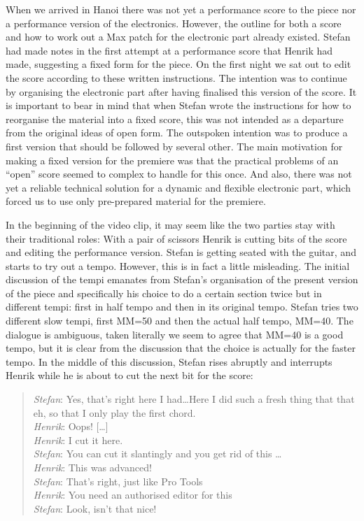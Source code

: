  When we arrived in Hanoi there was not yet a performance score to the
 piece nor a performance version of the electronics. However, the
 outline for both a score and how to work out a Max patch for the
 electronic part already existed. Stefan had made notes in the first
 attempt at a performance score that Henrik had made, suggesting a
 fixed form for the piece. On the first night we sat out to edit the
 score according to these written instructions. The intention was to
 continue by organising the electronic part after having finalised
 this version of the score. It is important to bear in mind that when
 Stefan wrote the instructions for how to reorganise the material into
 a fixed score, this was not intended as a departure from the original
 ideas of open form. The outspoken intention was to produce a first
 version that should be followed by several other. The main motivation
 for making a fixed version for the premiere was that the practical
 problems of an ``open'' score seemed to complex to handle for this
 once. And also, there was not yet a reliable technical solution for a
 dynamic and flexible electronic part, which forced us to use only
 pre-prepared material for the premiere.
 
In the beginning of the video clip, it may seem like the two parties
stay with their traditional roles: With a pair of scissors Henrik is
cutting bits of the score and editing the performance version. Stefan
is getting seated with the guitar, and starts to try out a
tempo. However, this is in fact a little misleading. The initial
discussion of the tempi emanates from Stefan's organisation of the
present version of the piece and specifically his choice to do a
certain section twice but in different tempi: first in half tempo and
then in its original tempo. Stefan tries two different slow tempi,
first MM=50 and then the actual half tempo, MM=40. The dialogue is
ambiguous, taken literally we seem to agree that MM=40 is a good
tempo, but it is clear from the discussion that the choice is actually
for the faster tempo. In the middle of this discussion, Stefan rises
abruptly and interrupts Henrik while he is about to cut the next bit
for the score:

\begin{quote}
  \emph{Stefan}: Yes, that's right here I had\ldots Here I did such a fresh
  thing that that eh, so that I only play the first chord.\\
  \emph{Henrik}: Oops! [\ldots]\\
  \emph{Henrik}: I cut it here.\\
  \emph{Stefan}: You can cut it slantingly and you get rid of this \ldots\\
  \emph{Henrik}: This was advanced!\\
  \emph{Stefan}: That's right, just like Pro Tools\\
  \emph{Henrik}: You need an authorised editor for this\\
  \emph{Stefan}: Look, isn't that nice!\\
\end{quote}

